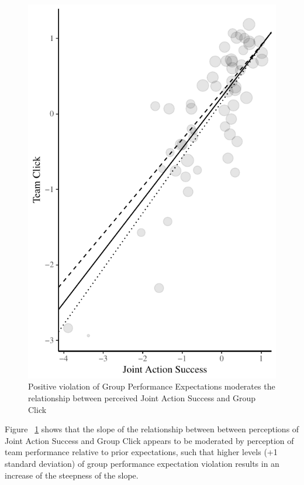 \begin{figure}
  \centering
  \includegraphics{images/groupPerfExpJASClickScatterLM}
\caption{Positive violation of Group Performance Expectations
 moderates the relationship between perceived Joint Action Success and Group Click}
 \label{fig:jASgroupPerfExpClickScatterLM}
\end{figure}


Figure ~\ref{fig:jASgroupPerfExpClickScatterLM} shows that the slope of the relationship between between perceptions of Joint Action Success and Group Click appears to be moderated by perception of team performance relative to prior expectations, such that higher levels (+1 standard deviation) of group performance expectation violation results in an increase of the steepness of the slope.

